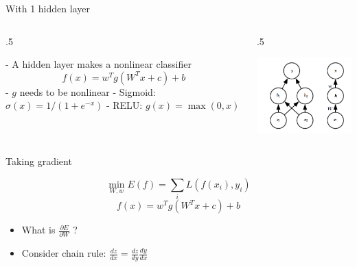\documentclass[12pt,notes,mathserif]{beamer}
\newcommand{\begincols}[1]{\begin{column}{#1}}
\newcommand{\stopcols}{\end{column}}
\begin{document}
\begin{frame}{With 1 hidden layer}

\begin{columns}
            
    \begincols{.5\textwidth}
        
    - A hidden layer makes a nonlinear classifier
    $$
    f(x)=w^{{T}}g(W^{{T}}x+c)+b
    $$
    - ${g}$ needs to be nonlinear
    - Sigmoid: $\sigma(x)=1/(1+e^{-x})$
    - RELU: $g({x})=\max(0,{x})$
        
    \stopcols
        
    \begincols{.5\textwidth}
    \begin{center}
        \includegraphics[width=\textwidth]{2018-04-15-13-08-28.png}
    \end{center}
    \stopcols
        
\end{columns}

\end{frame}

\begin{frame}{Taking gradient}

\[
\min_{W,w}E(f)=\sum_{i}L(f(x_{i}),y_{i})
\] \[
f(x)=w^{T}g(W^{T}x+c)+b
\]

\begin{itemize}
\item
  What is \(\frac{\partial E}{\partial W}\) ?
\item
  Consider chain rule: \(\frac{dz}{dx}=\frac{dz}{dy}\frac{dy}{dx}\)
\end{itemize}

\end{frame}
\end{document}
